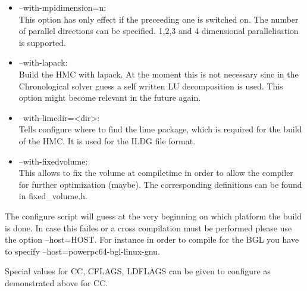 \begin{itemize}
\item {\ttfamily --with-mpidimension=n}:\\
  This option has only effect if the preceeding one is switched
  on. The number of parallel directions can be specified. 1,2,3 and 4
  dimensional parallelisation is supported.

\item {\ttfamily --with-lapack}:\\
  Build the HMC with lapack. At the moment this is not necessary sinc
  in the Chronological solver guess a self written LU decomposition is
  used. This option might become relevant in the future again.

\item {\ttfamily --with-limedir=<dir>}:\\
 Tells configure where to find the lime package, which is required for
 the build of the HMC. It is used for the ILDG file format.

\item {\ttfamily --with-fixedvolume}:\\
  This allows to fix the volume at compiletime in order to allow the
  compiler for further optimization (maybe). The corresponding
  definitions can be found in {\ttfamily fixed\_volume.h}.


\end{itemize}

The configure script will guess at the very beginning on which
platform the build is done. In case this failes or a cross compilation
must be performed please use the option {\ttfamily --host=HOST}. For
instance in order to compile for the BGL you have to specify
{\ttfamily --host=powerpc64-bgl-linux-gnu}.

Special values for {\ttfamily CC, CFLAGS, LDFLAGS} can be given to
configure as demonstrated above for {\ttfamily CC}.


